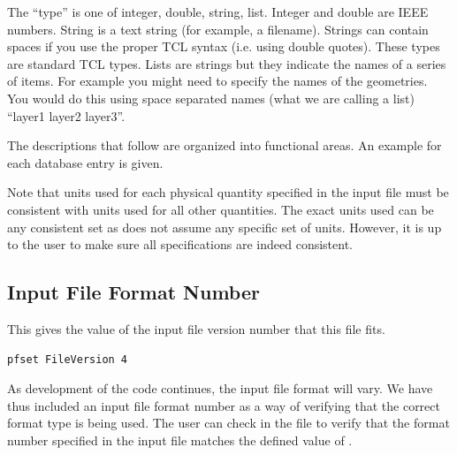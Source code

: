 \vspace{0.25in}
The ``type'' is one of integer, double, string, list.  Integer and double are
IEEE numbers.  String is a text string (for example, a filename).
Strings can contain spaces if you use the proper TCL syntax
(i.e. using double quotes).  These types are standard TCL
types.  Lists are strings but they indicate the names of a series of items.
For example you might need to specify the names of the geometries. You
would do this using space separated names (what we are calling a list)
``layer1 layer2 layer3''.

The descriptions that follow are organized into functional areas.  An
example for each database entry is given.

Note that units used for each physical quantity specified in the input file
must be consistent with units used for all other quantities.  The exact units
used can be any consistent set as \parflow{} does not assume any specific set
of units.  However, it is up to the user to make sure all specifications are
indeed consistent.


\subsection{Input File Format Number}
\label{Input File Format Number}

{This gives the value of
the input file version number that this file fits.}
\begin{display}\begin{verbatim}
pfset FileVersion 4
\end{verbatim}\end{display}

As development of the \parflow{} code continues, the input file format
will vary.  We have thus included an input file format number as a way
of verifying that the correct format type is being used.  The user can
check in the  file to verify that
the format number specified in the input file matches the defined
value of .


